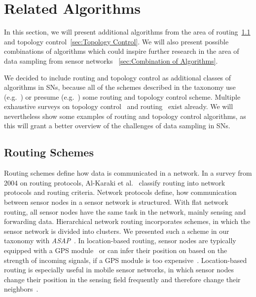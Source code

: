\FloatBarrier

\section{Related Algorithms}
\label{sec:Related Algorithms}

In this section, we will present additional algorithms from the area of
routing~\ref{sec:Routing} and topology control~\ref{sec:Topology Control}. We
will also present possible combinations of algorithms which could inspire
further research in the area of data sampling from sensor networks
~\ref{sec:Combination of Algorithms}.

We decided to include routing and topology control as additional classes of
algorithms in \acp{SN}, because  all of the schemes described in the taxonomy
use (e.g.~\cite{padhy2006utility}) or presume
(e.g.~\cite{silberstein2006constraint}) some routing and topology control
scheme. Multiple exhaustive surveys on topology control~\cite{aziz2013survey,
li2013survey} and routing~\cite{al2004routing, pantazis2013energy,
singh2010routing} exist already. We will nevertheless show some examples of
routing and topology control algorithms, as this will grant a better overview
of the challenges of data sampling in \acp{SN}.

\subsection{Routing Schemes}
\label{sec:Routing}

Routing schemes define how data is communicated in a network. In a survey from
2004 on routing protocols, Al-Karaki et al.~\cite{al2004routing} classify
routing into network protocols and routing criteria. Network protocols define,
how communication between sensor nodes in a sensor network is structured. With
flat network routing, all sensor nodes have the same task in the network,
mainly sensing and forwarding data. Hierarchical network routing incorporates
schemes, in which the sensor network is divided into clusters. We presented
such a scheme in our taxonomy with \textit{ASAP}~\cite{gedik2007asap}. In
location-based routing, sensor nodes are typically equipped with a GPS
module~\cite{xu2001geography} or can infer their position on based on the
strength of incoming signals, if a GPS module is too
expensive~\cite{hu2004localization}. Location-based routing is especially
useful in mobile sensor networks, in which sensor nodes change their position
in the sensing field frequently and therefore change their
neighbors~\cite{hu2004localization}.

